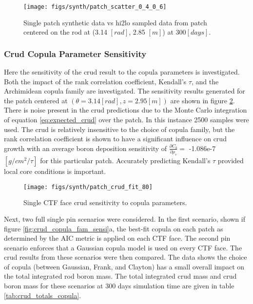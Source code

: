 \begin{figure}[H]
    \centering
    \texttt{[image: figs/synth/patch\_scatter\_0\_4\_0\_6]}
    \caption[Single patch synthetic CFD data vs hi2lo sampled data.]{Single patch synthetic data vs hi2lo sampled data from patch centered on the rod at (3.14 $[rad]$, 2.85 $[m]$) at 300$[days]$.}
    \label{fig:patchscatter}
\end{figure}

\subsubsection{Crud Copula Parameter Sensitivity}

Here the sensitivity of the crud result to the copula parameters is investigated.  Both the impact of the rank correlation coefficient, Kendall's $\tau$, and the Archimidean copula family are investigated.  The sensitivity results generated for the patch centered at $(\theta=3.14[rad], z=2.95[m])$ are shown in figure \ref{fig:patchcrudfit80}.  There is noise present in the crud predictions due to the Monte Carlo integration of equation \ref{eq:expected_crud} over the patch.  In this instance 2500 samples were used.  The crud is relatively insensitive to the choice of copula family, but the rank correlation coefficient is shown to have a significant influence on crud growth with an average boron deposition sensitivity of $\frac{\partial C_b}{\partial \rho_\tau} =$ -1.086e-7 $[g/cm^2/\tau]$ for this particular patch.  Accurately predicting Kendall's $\tau$ provided local core conditions is important.

\begin{figure}[H]
    \centering
    \texttt{[image: figs/synth/patch\_crud\_fit\_80]}
    \caption{Single CTF face crud sensitivity to copula parameters.}
    \label{fig:patchcrudfit80}
\end{figure}

Next, two full single pin scenarios were considered. In the first scenario, shown if figure \ref{fig:crud_copula_fam_sensi}a, the best-fit copula on each patch as determined by the AIC metric is applied on each CTF face.  The second pin scenario enforces that a Gaussian copula model is used on every CTF face.  The crud results from these scenarios were then compared.  The data shows the choice of copula (between Gaussian, Frank, and Clayton) has a small overall impact on the total integrated rod boron mass.   The total integrated crud mass and crud boron mass for these scenarios at 300 days simulation time are given in table \ref{tab:crud_totals_copula}.


